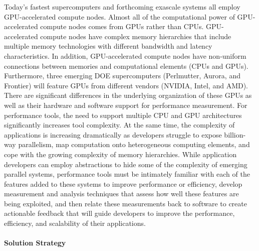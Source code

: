 Today's fastest supercomputers and forthcoming exascale systems all
employ GPU-accelerated compute nodes. Almost all of the 
computational power of GPU-accelerated compute nodes comes from GPUs rather than CPUs.
GPU-accelerated compute nodes have complex memory hierarchies that include 
multiple memory technologies with different bandwidth and latency characteristics. In addition, 
GPU-accelerated compute nodes have non-uniform connections between memories and computational elements (CPUs and GPUs). 
Furthermore, three emerging DOE supercomputers (Perlmutter, Aurora, and Frontier) will feature GPUs from different vendors (NVIDIA, Intel, and AMD). 
There are significant differences in the underlying organization of these GPUs as well as their hardware and software support for performance measurement. For
performance tools, the need to support multiple CPU and GPU architectures significantly increases tool complexity.  At the same time, the
complexity of applications is increasing dramatically as developers
struggle to expose billion-way parallelism, map computation onto
heterogeneous computing elements, and cope with the growing complexity
of memory hierarchies. While application developers can employ
abstractions to hide some of the complexity of emerging parallel
systems, performance tools must be intimately familiar with each of
the features added to these systems to improve performance or
efficiency, develop measurement and analysis techniques that assess
how well these features are being exploited, and then relate these
measurements back to software to create actionable feedback that will
guide developers to improve the performance, efficiency, and
scalability of their applications.

\paragraph{Solution Strategy}

